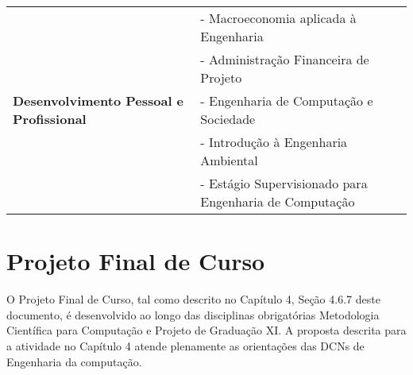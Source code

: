 \begin{table}[ht]
\begin{tabular}{l l}
                                & - Macroeconomia aplicada à Engenharia                  \\

                                & - Administração Financeira de Projeto                  \\

        \hline

        \textbf{Desenvolvimento Pessoal e Profissional}
                                & - Engenharia de Computação e Sociedade                 \\

                                & - Introdução à Engenharia Ambiental                    \\

                                & - Estágio Supervisionado para Engenharia de Computação \\

        \hline
    \end{tabular}
\end{table}


\section{Projeto Final de Curso}
O Projeto Final de Curso, tal como descrito no Capítulo 4, Seção 4.6.7 deste documento, é
desenvolvido ao longo das disciplinas obrigatórias Metodologia Científica para Computação e Projeto de Graduação XI. A proposta descrita para a atividade no Capítulo 4 atende plenamente as orientações das DCNs de Engenharia da computação.

